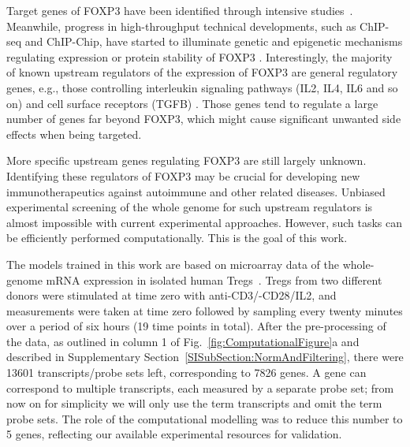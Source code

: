 \documentclass[oneside, 10pt, a4paper, twocolumn]{article}
\begin{document}
Target genes of FOXP3 have been 
identified through intensive studies~\citep{Marson2007, Zheng2007, ZhengRudensky2007}. Meanwhile, progress in high-throughput technical developments, such as ChIP-seq and ChIP-Chip, have started to illuminate 
genetic and epigenetic mechanisms regulating expression or protein stability of FOXP3 \citep{Floess2007, Fu2012, Miyara2007, Schmidt2012, CHEN2013272,GaoE3246}. Interestingly, the majority of known upstream regulators of the expression of FOXP3 are general regulatory genes, e.g., those controlling interleukin signaling pathways (IL2, IL4, IL6 and so on) and cell surface receptors (TGFB)  \citep{Lal2009}. Those 
genes tend to regulate a large number of genes far beyond FOXP3, which might cause significant unwanted side effects when being targeted. 

More specific upstream genes regulating FOXP3 are still largely unknown. Identifying these regulators of FOXP3 may be crucial for developing new immunotherapeutics against autoimmune and other related diseases. Unbiased experimental screening of the whole genome for such upstream regulators is almost impossible with current experimental approaches. However, such tasks can be efficiently performed computationally. This is the goal of this work.

The models trained in this work are based on microarray data of the whole-genome mRNA expression in isolated human Tregs~\citep{he2012plau}. Tregs from two different donors were stimulated at time zero with anti-CD3/-CD28/IL2, and measurements were taken at time zero followed by sampling every twenty minutes over a period of six hours (19 time points in total). After the pre-processing of the data, as outlined in column 1 of Fig.~\ref{fig:ComputationalFigure}a and described in Supplementary Section~\ref{SISubSection:NormAndFiltering}, there were 
13601 transcripts/probe sets left, corresponding to 7826 genes. A gene can correspond to multiple transcripts, each measured by a separate probe set; from now on for simplicity we will only use the term transcripts and omit the term probe sets. The role of the computational modelling was to reduce this number to 5 genes, reflecting our available experimental resources for validation.
\end{document}

